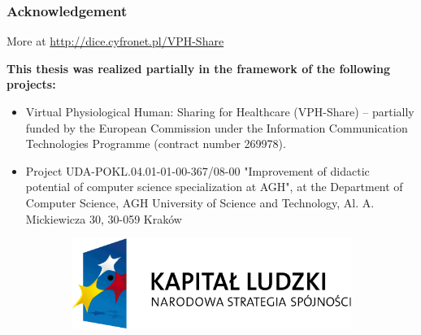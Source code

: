 \documentclass[9pt]{beamer}
\begin{document}
\begin{frame}
\frametitle{\hspace{5mm} \textbf{Acknowledgement}}
More at \url{http://dice.cyfronet.pl/VPH-Share}\\

\begin{block}{}
\textbf{This thesis was realized partially in the framework of the following projects:}
\begin{itemize}
	\item Virtual Physiological Human: Sharing for Healthcare (VPH-Share) – partially funded by the European Commission under the Information Communication Technologies Programme (contract number 269978).
	\item Project UDA-POKL.04.01-01-00-367/08-00 "Improvement of didactic potential of computer science specialization at AGH", at the Department of Computer Science, AGH University of Science and Technology, Al. A. Mickiewicza 30, 30-059 Kraków
\end{itemize}
\end{block}
\begin{figure}[h!]
	\centering
	\begin{subfigure}[b]{0.3\textwidth}
		\includegraphics[width=\textwidth, keepaspectratio=true]{img/kapital.png}
	\end{subfigure}
	\qquad
	\begin{subfigure}[b]{0.06\textwidth}

\end{subfigure}
\end{figure}
\end{frame}
\end{document}
